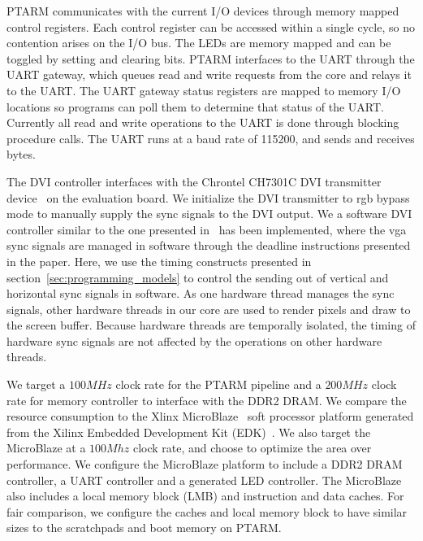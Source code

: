 PTARM communicates with the current I/O devices through memory mapped control registers.
Each control register can be accessed within a single cycle, so no contention arises on the I/O bus.  
The LEDs are memory mapped and can be toggled by setting and clearing bits.
PTARM interfaces to the UART through the UART gateway, which queues read and write requests from the core and relays it to the UART.
The UART gateway status registers are mapped to memory I/O locations so programs can poll them to determine that status of the UART.  
Currently all read and write operations to the UART is done through blocking procedure calls. 
The UART runs at a baud rate of 115200, and sends and receives bytes.

The DVI controller interfaces with the Chrontel CH7301C DVI transmitter device~\cite{chrontel-dvi} on the evaluation board. 
We initialize the DVI transmitter to rgb bypass mode to manually supply the sync signals to the DVI output.   
We a software DVI controller similar to the one presented in~\cite{ip2006processor} has been implemented, where the vga sync signals are managed in software through the deadline instructions presented in the paper.
Here, we use the timing constructs presented in section~\ref{sec:programming_models} to control the sending out of vertical and horizontal sync signals in software.
As one hardware thread manages the sync signals, other hardware threads in our core are used to render pixels and draw to the screen buffer.  
Because hardware threads are temporally isolated, the timing of hardware sync signals are not affected by the operations on other hardware threads.  

We target a $100MHz$ clock rate for the PTARM pipeline and a $200MHz$ clock rate for memory controller to interface with the DDR2 DRAM.
We compare the resource consumption to the Xlinx MicroBlaze~\cite{xilinx-microblaze} soft processor platform generated from the Xilinx Embedded Development Kit (EDK)~\cite{xilinx-edk}.
We also target the MicroBlaze at a $100Mhz$ clock rate, and choose to optimize the area over performance.
We configure the MicroBlaze platform to include a DDR2 DRAM controller, a UART controller and a generated LED controller. 
The MicroBlaze also includes a local memory block (LMB) and instruction and data caches. 
For fair comparison, we configure the caches and local memory block to have similar sizes to the scratchpads and boot memory on PTARM.       

